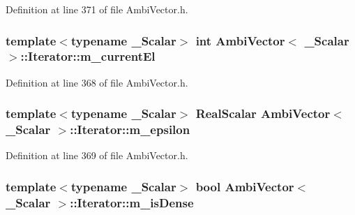 Definition at line 371 of file Ambi\-Vector.\-h.

\hypertarget{class_ambi_vector_1_1_iterator_adc920f115aa20828b40c85b45324058b}{
\subsubsection[{m\-\_\-current\-El}]{\setlength{\rightskip}{0pt plus 5cm}template$<$typename \-\_\-\-Scalar$>$ {\bf int} {\bf Ambi\-Vector}$<$ \-\_\-\-Scalar $>$\-::Iterator\-::m\-\_\-current\-El\hspace{0.3cm}{\ttfamily [protected]}}}\label{class_ambi_vector_1_1_iterator_adc920f115aa20828b40c85b45324058b}


Definition at line 368 of file Ambi\-Vector.\-h.

\hypertarget{class_ambi_vector_1_1_iterator_ad9cc037301d3fb4f49969dfa3e9ca6c1}{
\subsubsection[{m\-\_\-epsilon}]{\setlength{\rightskip}{0pt plus 5cm}template$<$typename \-\_\-\-Scalar$>$ {\bf Real\-Scalar} {\bf Ambi\-Vector}$<$ \-\_\-\-Scalar $>$\-::Iterator\-::m\-\_\-epsilon\hspace{0.3cm}{\ttfamily [protected]}}}\label{class_ambi_vector_1_1_iterator_ad9cc037301d3fb4f49969dfa3e9ca6c1}


Definition at line 369 of file Ambi\-Vector.\-h.

\hypertarget{class_ambi_vector_1_1_iterator_a77c83fead6fa25c862cdb54911b18d08}{
\subsubsection[{m\-\_\-is\-Dense}]{\setlength{\rightskip}{0pt plus 5cm}template$<$typename \-\_\-\-Scalar$>$ bool {\bf Ambi\-Vector}$<$ \-\_\-\-Scalar $>$\-::Iterator\-::m\-\_\-is\-Dense\hspace{0.3cm}{\ttfamily [protected]}}}\label{class_ambi_vector_1_1_iterator_a77c83fead6fa25c862cdb54911b18d08}


